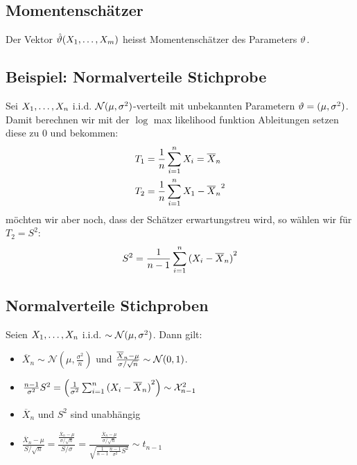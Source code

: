 \subsection*{Momentenschätzer}
Der Vektor $\hat{\vartheta} (X_1, \dots, X_m)$ heisst Momentenschätzer des Parameters
$\vartheta$.
\BoxStart{}
\subsection*{Beispiel: Normalverteile Stichprobe}
Sei $X_1, \dots, X_n$ i.i.d. $\mathcal{N} (\mu, \sigma^2)$-verteilt mit unbekannten
Parametern $\vartheta = (\mu, \sigma^2)$. Damit berechnen wir mit der $\log$ max
likelihood funktion Ableitungen setzen diese zu $0$ und bekommen:
\begin{align*}
  T_1 & = \frac{1}{n} \sum_{i = 1}^n X_i = \overline{X}_n     \\
  T_2 & = \frac{1}{n} \sum_{i = 1}^n {X_1 - \overline{X}_n}^2
\end{align*}
möchten wir aber noch, dass der Schätzer erwartungstreu wird,
so wählen wir für $T_2 = S^2$:
\begin{align*}
  S^2 = \frac{1}{n-1} \sum_{i = 1}^n  {(X_i - \overline{X}_n)}^2
\end{align*}
\BoxEnd{}
\subsection*{Normalverteile Stichproben}
Seien $X_1, \dots, X_n$ i.i.d. $\sim \mathcal{N} (\mu, \sigma^2)$. Dann gilt:
\begin{itemize}
  \item $\overline{X}_n \sim \mathcal{N} (\mu, \frac{\sigma^2}{n})$
        und $\frac{\overline{X}_n - \mu}{\sigma / \sqrt{n}} \sim \mathcal{N} (0, 1)$.
  \item $\frac{n-1}{\sigma^2} S^2 = \left( \frac{1}{\sigma^2} \sum_{i = 1}^n  {(X_i - \overline{X}_n)}^2 \right) \sim \mathcal{X}^2_{n-1}$
  \item $\overline{X}_n$ und $S^2$ sind unabhängig
  \item $\frac{\overline{X}_n - \mu}{S / \sqrt{n}} = \frac{ \frac{\overline{X}_n - \mu}{\sigma / \sqrt{n}} }{S / \sigma} = \frac{ \frac{\overline{X}_n - \mu}{\sigma / \sqrt{n}} }{\sqrt{\frac{1}{n-1} \frac{n-1}{\sigma^2} S^2}} \sim t_{n-1}$
\end{itemize}
